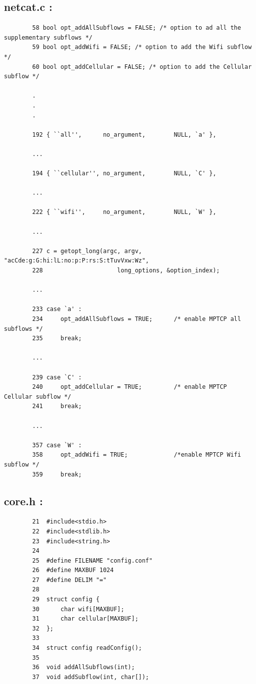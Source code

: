 \documentclass[a4paper,11pt]{article}
\begin{document}
	 	\subsection{netcat.c :}
	 	\label{subsec:netcat.c}
	 	\begin{lstlisting}
	 	58 bool opt_addAllSubflows = FALSE; /* option to ad all the supplementary subflows */
	 	59 bool opt_addWifi = FALSE; /* option to add the Wifi subflow */
	 	60 bool opt_addCellular = FALSE; /* option to add the Cellular subflow */

	 	.
	 	.
	 	.

	 	192 { ``all'', 		no_argument, 		NULL, `a' },

	 	...

	 	194 { ``cellular'', no_argument,		NULL, `C' },

	 	...

	 	222 { ``wifi'', 	no_argument,		NULL, `W' },

	 	...

	 	227 c = getopt_long(argc, argv, "acCde:g:G:hi:lL:no:p:P:rs:S:tTuvVxw:Wz",
		228 					long_options, &option_index);

		...

		233 case `a' :
		234 	opt_addAllSubflows = TRUE;		/* enable MPTCP all subflows */
		235 	break;

		...

		239 case `C' :
		240		opt_addCellular = TRUE;			/* enable MPTCP Cellular subflow */
		241		break;

		...

		357 case `W' :
		358		opt_addWifi = TRUE;				/*enable MPTCP Wifi subflow */
		359		break;
	 	\end{lstlisting}

	 	\subsection{core.h :}
	 	\label{subsec:core.h}
	 	\begin{lstlisting}
		21 	#include<stdio.h>
		22	#include<stdlib.h>
		23	#include<string.h>
		24
		25	#define FILENAME "config.conf"
		26	#define MAXBUF 1024
		27	#define DELIM "="
		28
		29	struct config {
		30		char wifi[MAXBUF];
		31		char cellular[MAXBUF];
		32	};
		33
		34	struct config readConfig();
		35
		36	void addAllSubflows(int);
		37	void addSubflow(int, char[]);
		\end{lstlisting}
\end{document}
